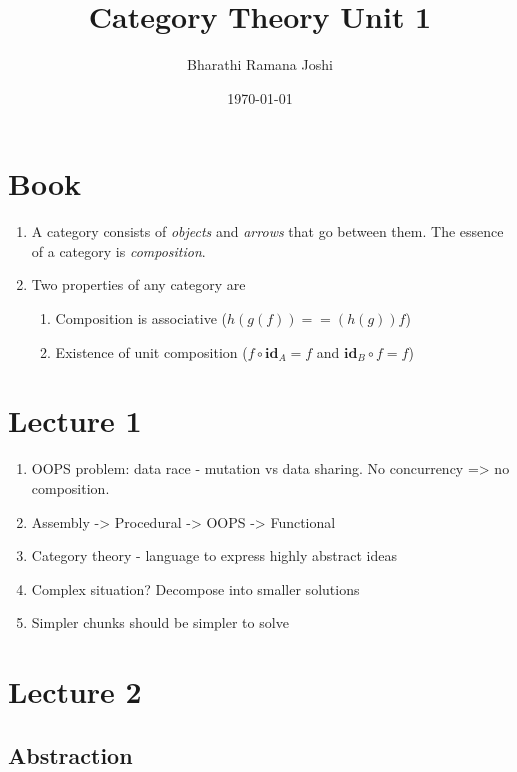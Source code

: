 \documentclass[titlepage, 12pt]{article}
\begin{document}
\title{Category Theory Unit 1}

\author{Bharathi Ramana Joshi}

\date{\today}

\maketitle

\newpage

\section{Book}

\begin{enumerate}
	\item A category consists of \textit{objects} and \textit{arrows} that go
		between them. The essence of a category is \textit{composition}.
	\item Two properties of any category are
		\begin{enumerate}
			\item Composition is associative ($h(g(f)) == (h(g))f$)
			\item Existence of unit composition ($f\circ\textbf{id}_A = f$ and
				$\textbf{id}_B\circ f = f$)
		\end{enumerate}
\end{enumerate}

\section{Lecture 1}

\begin{enumerate}
	\item OOPS problem: data race - mutation vs data sharing. No
		concurrency => no composition.
	\item Assembly -> Procedural -> OOPS -> Functional
	\item Category theory - language to express highly abstract ideas
	\item Complex situation? Decompose into smaller solutions
	\item Simpler chunks should be simpler to solve
\end{enumerate}

\section{Lecture 2}

\subsection{Abstraction}
\end{document}

